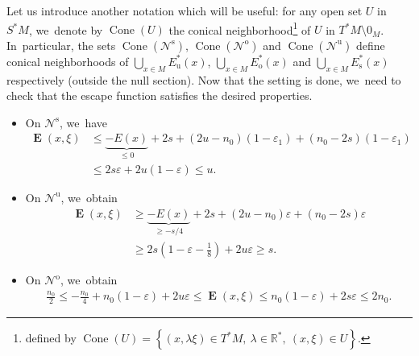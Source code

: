 \documentclass[JEP,XML,SOM,Unicode,NoEqCountersInSection,NoFloatCountersInSection,published]{cedram}
\newcommand{\ro}{\mathrm{o}}
\newcommand{\rs}{\mathrm{s}}
\newcommand{\ru}{\mathrm{u}}
\theoremstyle{definition}
\theoremstyle{plain}
\newcommand{\Ncal}{\mathcal{N}}
\newcommand{\R}{\mathbb{R}}
\DeclareMathOperator{\Cone}{Cone}
\DeclareMathOperator{\E}{\boldsymbol{E}}
\begin{document}
Let us introduce another notation which will be useful: for any open set $U$ in $S^*M$, we~denote by $\Cone(U)$ the conical neighborhood\footnote{defined by $\Cone(U) = \left\{ (x,\lambda \xi) \in T^* M, \: \lambda \in \R^*, \: (x,\xi) \in U \right\}$.} of $U$ in $T^*M \setminus 0_M$. In~particular, the sets $\Cone(\Ncal^\rs)$, $\Cone(\Ncal^\ro)$ and $\Cone(\Ncal^\ru)$ define conical neighborhoods of $\bigcup_{x \in M} E_\ru^* (x)$, $\bigcup_{x \in M} E_\ro^* (x)$ and $\bigcup_{x \in M} E_\rs^* (x)$ respectively (outside the null section). Now that the setting is done, we~need to check that the escape function satisfies the desired properties.
\begin{itemize}
\item On $\Ncal^\rs$, we~have
\begin{align*}
\E(x,\xi) &\leq \underbrace{-E (x)}_{\leq 0} + 2s + (2u - n_0) (1 - \varepsilon_1) + (n_0 - 2s) (1 - \varepsilon_1) \\
&\leq 2s \varepsilon + 2u (1 - \varepsilon) \leq u.
\end{align*}
\item On $\Ncal^\ru$, we~obtain
\begin{align*}
\E(x,\xi) &\geq \underbrace{-E (x)}_{\geq - s/4} + 2s + (2u - n_0) \varepsilon + (n_0 - 2s) \varepsilon \\
&\geq 2s (1 - \varepsilon - \frac{1}{8}) + 2u \varepsilon \geq s.
\end{align*}
\item On $\Ncal^\ro$, we~obtain
\begin{align*}
\frac{n_0}{2} \leq - \frac{n_0}{4} + n_0 (1 - \varepsilon) + 2u \varepsilon \leq \E(x,\xi) \leq n_0 (1 - \varepsilon) + 2s \varepsilon \leq 2n_0.
\end{align*}
\end{itemize}
\end{document}
